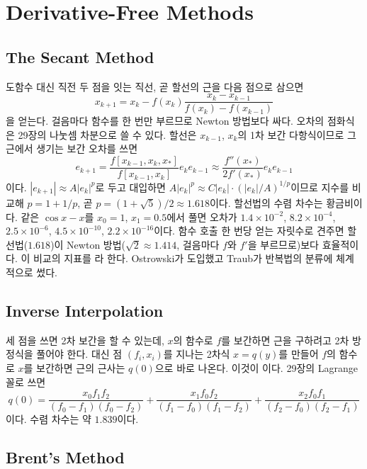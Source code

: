 \section{Derivative-Free Methods}
\label{sec:derivative-free}

\subsection{The Secant Method}

도함수 대신 직전 두 점을 잇는 직선, 곧 할선의 근을 다음 점으로 삼으면 
\[
x_{k+1}=x_k-f(x_k)\frac{x_k-x_{k-1}}{f(x_k)-f(x_{k-1})}
\]
을 얻는다. 걸음마다 함수를 한 번만 부르므로 Newton 방법보다 싸다. 오차의 점화식은 29장의 나눗셈 차분으로 쓸 수 있다. 할선은 $x_{k-1}$, $x_k$의 1차 보간 다항식이므로 그 근에서 생기는 보간 오차를 쓰면
\[
e_{k+1}=\frac{f[x_{k-1},x_k,x_\ast]}{f[x_{k-1},x_k]}e_ke_{k-1}\approx\frac{f''(x_\ast)}{2f'(x_\ast)}e_ke_{k-1}
\]
이다. $|e_{k+1}|\approx A|e_k|^p$로 두고 대입하면 $A|e_k|^p\approx C|e_k|\cdot(|e_k|/A)^{1/p}$이므로 지수를 비교해 $p=1+1/p$, 곧 $p=(1+\sqrt5)/2\approx1.618$이다. 할선법의 수렴 차수는 황금비이다. 같은 $\cos x-x$를 $x_0=1$, $x_1=0.5$에서 풀면 오차가 $1.4\times10^{-2}$, $8.2\times10^{-4}$, $2.5\times10^{-6}$, $4.5\times10^{-10}$, $2.2\times10^{-16}$이다. 함수 호출 한 번당 얻는 자릿수로 견주면 할선법($1.618$)이 Newton 방법($\sqrt2\approx1.414$, 걸음마다 $f$와 $f'$을 부르므로)보다 효율적이다. 이 비교의 지표를 라 한다. Ostrowski가 도입했고 Traub가 반복법의 분류에 체계적으로 썼다\cite{traub1964}.

\subsection{Inverse Interpolation}

세 점을 쓰면 2차 보간을 할 수 있는데, $x$의 함수로 $f$를 보간하면 근을 구하려고 2차 방정식을 풀어야 한다. 대신 점 $(f_i,x_i)$를 지나는 2차식 $x=q(y)$를 만들어 $f$의 함수로 $x$를 보간하면 근의 근사는 $q(0)$으로 바로 나온다. 이것이 이다. 29장의 Lagrange 꼴로 쓰면
\[
q(0)=\frac{x_0f_1f_2}{(f_0-f_1)(f_0-f_2)}+\frac{x_1f_0f_2}{(f_1-f_0)(f_1-f_2)}+\frac{x_2f_0f_1}{(f_2-f_0)(f_2-f_1)}
\]
이다. 수렴 차수는 약 $1.839$이다.

\subsection{Brent's Method}

